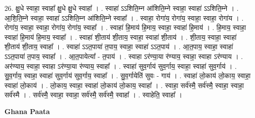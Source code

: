 \documentclass[17pt]{extarticle}
\begin{document}
26. क्षु॒धे स्वाहा॒ स्वाहा᳚ क्षु॒धे क्षु॒धे स्वाहा᳚ । . स्वाहा॑ ऽऽशिति॒म्न आ॑शिति॒म्ने स्वाहा॒ स्वाहा॑ ऽऽशिति॒म्ने । . आ॒शि॒ति॒म्ने स्वाहा॒ स्वाहा॑ ऽऽशिति॒म्न आ॑शिति॒म्ने स्वाहा᳚ । . स्वाहा॒ रोगा॑य॒ रोगा॑य॒ स्वाहा॒ स्वाहा॒ रोगा॑य । . रोगा॑य॒ स्वाहा॒ स्वाहा॒ रोगा॑य॒ रोगा॑य॒ स्वाहा᳚ । . स्वाहा॑ हि॒माय॑ हि॒माय॒ स्वाहा॒ स्वाहा॑ हि॒माय॑ । . हि॒माय॒ स्वाहा॒ स्वाहा॑ हि॒माय॑ हि॒माय॒ स्वाहा᳚ । . स्वाहा॑ शी॒ताय॑ शी॒ताय॒ स्वाहा॒ स्वाहा॑ शी॒ताय॑ । . शी॒ताय॒ स्वाहा॒ स्वाहा॑ शी॒ताय॑ शी॒ताय॒ स्वाहा᳚ । . स्वाहा॑ ऽऽत॒पाया॑ त॒पाय॒ स्वाहा॒ स्वाहा॑ ऽऽत॒पाय॑ । . आ॒त॒पाय॒ स्वाहा॒ स्वाहा॑ ऽऽत॒पाया॑ त॒पाय॒ स्वाहा᳚ । . आ॒त॒पायेत्या᳚ - त॒पाय॑ । . स्वाहा ऽर॑ण्या॒या र॑ण्याय॒ स्वाहा॒ स्वाहा ऽर॑ण्याय । . अर॑ण्याय॒ स्वाहा॒ स्वाहा ऽर॑ण्या॒या र॑ण्याय॒ स्वाहा᳚ । . स्वाहा॑ सुव॒र्गाय॑ सुव॒र्गाय॒ स्वाहा॒ स्वाहा॑ सुव॒र्गाय॑ । . सु॒व॒र्गाय॒ स्वाहा॒ स्वाहा॑ सुव॒र्गाय॑ सुव॒र्गाय॒ स्वाहा᳚ । . सु॒व॒र्गायेति॑ सुवः - गाय॑ । . स्वाहा॑ लो॒काय॑ लो॒काय॒ स्वाहा॒ स्वाहा॑ लो॒काय॑ । . लो॒काय॒ स्वाहा॒ स्वाहा॑ लो॒काय॑ लो॒काय॒ स्वाहा᳚ । . स्वाहा॒ सर्व॑स्मै॒ सर्व॑स्मै॒ स्वाहा॒ स्वाहा॒ सर्व॑स्मै । . सर्व॑स्मै॒ स्वाहा॒ स्वाहा॒ सर्व॑स्मै॒ सर्व॑स्मै॒ स्वाहा᳚ । . स्वाहेति॒ स्वाहा᳚ । \newline

\textbf{Ghana Paata } \newline
\end{document}
